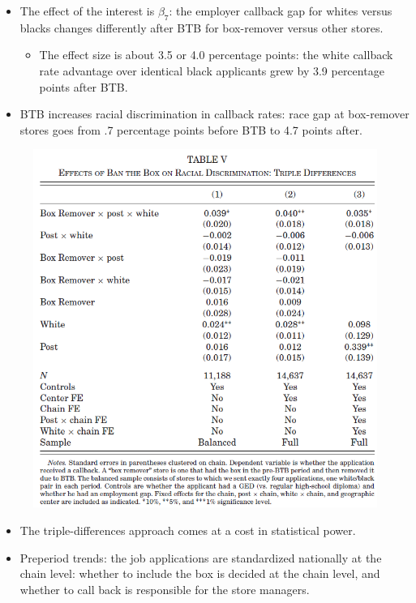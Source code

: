 \documentclass[../root]{subfiles}
\begin{document}
    \begin{itemize}
      \item The effect of the interest is $\beta_7$: the employer callback gap for whites versus blacks changes differently after BTB for box-remover versus other stores.
      \begin{itemize}
        \item The effect size is about 3.5 or 4.0 percentage points: the white callback rate advantage over identical black applicants grew by 3.9 percentage points after BTB.
      \end{itemize}
      \item BTB increases racial discrimination in callback rates: race gap at box-remover stores goes from .7 percentage points before BTB to 4.7 points after.
    \end{itemize}

    \begin{figure}[ht]
        \centering
        \includegraphics[scale = .8]{0925tanji/T5}
    \end{figure}

    \begin{itemize}
      \item The triple-differences approach comes at a cost in statistical power.
      \item Preperiod trends: the job applications are standardized nationally at the chain level: whether to include the box is decided at the chain level, and whether to call back is responsible for the store managers.
    \end{itemize}
\end{document}
